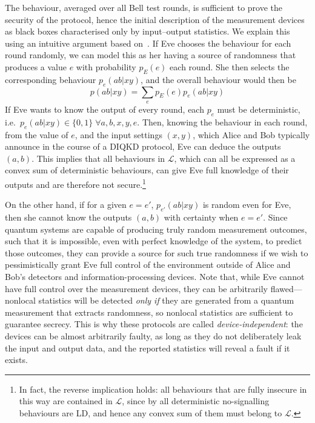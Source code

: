 \documentclass[10pt, a4paper]{article}
\numberwithin{equation}{section} %
\theoremstyle{definition}
\theoremstyle{plain}
\newcommand{\?}{\mathrel{?}} %
\newcommand{\Ls}{\mathcal{L}}
\begin{document}
    The behaviour, averaged over all Bell test rounds, is sufficient to prove the security of the protocol, hence the initial description of the measurement devices as black boxes characterised only by input--output statistics. We explain this using an intuitive argument based on~\cite[Sec. 1.3]{DIQKD_Lower}. If Eve chooses the behaviour for each round randomly, we can model this as her having a source of randomness that produces a value \(e\) with probability \(p_E(e)\) each round. She then selects the corresponding behaviour \(p_e(ab|xy)\), and the overall behaviour would then be
    \begin{equation}\label{eqn:eveattack}
      p(ab|xy) = \sum_e p_E(e) p_e(ab|xy)
    \end{equation}
    If Eve wants to know the output of every round, each \(p_e\) must be deterministic, i.e.\ \(p_e(ab|xy) \in \{0, 1\}\;\forall a,b,x,y,e\). Then, knowing the behaviour in each round, from the value of \(e\), and the input settings \((x,y)\), which Alice and Bob typically announce in the course of a DIQKD protocol, Eve can deduce the outputs \((a,b)\). This implies that all behaviours in \(\Ls\), which can all be expressed as a convex sum of deterministic behaviours, can give Eve full knowledge of their outputs and are therefore not secure.\footnote{In fact, the reverse implication holds: all behaviours that are fully insecure in this way are contained in \(\Ls\), since by  all deterministic no-signalling behaviours are LD, and hence any convex sum of them must belong to \(\Ls\).}

    On the other hand, if for a given \(e = e'\), \(p_{e'}(ab|xy)\) is random even for Eve, then she cannot know the outputs \((a,b)\) with certainty when \(e=e'\). Since quantum systems are capable of producing truly random measurement outcomes, such that it is impossible, even with perfect knowledge of the system, to predict those outcomes, they can provide a source for such true randomness if we wish to pessimistically grant Eve full control of the environment outside of Alice and Bob's detectors and information-processing devices. Note that, while Eve cannot have full control over the measurement devices, they can be arbitrarily flawed---nonlocal statistics will be detected \emph{only if} they are generated from a quantum measurement that extracts randomness, so nonlocal statistics are sufficient to guarantee secrecy. This is why these protocols are called \emph{device-independent}: the devices can be almost arbitrarily faulty, as long as they do not deliberately leak the input and output data, and the reported statistics will reveal a fault if it exists.
\end{document}
